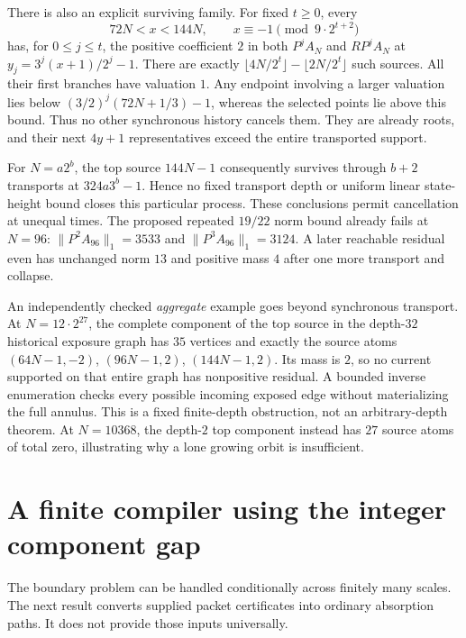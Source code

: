 \documentclass[11pt]{article}
\begin{document}
There is also an explicit surviving family. For fixed $t\ge0$, every
\[
72N<x<144N,\qquad x\equiv-1\pmod{9\cdot2^{t+2}}
\]
has, for $0\le j\le t$, the positive coefficient $2$ in both
$P^jA_N$ and $RP^jA_N$ at $y_j=3^j(x+1)/2^j-1$.
There are exactly
$\lfloor4N/2^t\rfloor-\lfloor2N/2^t\rfloor$ such sources.
All their first branches have valuation $1$. Any endpoint involving a
larger valuation lies below $(3/2)^j(72N+1/3)-1$, whereas the selected
points lie above this bound. Thus no other synchronous history cancels
them. They are already roots, and their next $4y+1$ representatives
exceed the entire transported support.

For $N=a2^b$, the top source $144N-1$ consequently survives through
$b+2$ transports at $324a3^b-1$. Hence no fixed transport depth or
uniform linear state-height bound closes this particular process.
These conclusions permit cancellation at unequal times. The proposed
repeated $19/22$ norm bound already fails at $N=96$:
$\|P^2A_{96}\|_1=3533$ and $\|P^3A_{96}\|_1=3124$.
A later reachable residual even has unchanged norm $13$ and positive
mass $4$ after one more transport and collapse.

An independently checked \emph{aggregate} example goes beyond synchronous
transport. At $N=12\cdot2^{27}$, the complete component of the top source
in the depth-$32$ historical exposure graph has $35$ vertices and exactly
the source atoms $(64N-1,-2)$, $(96N-1,2)$, $(144N-1,2)$.
Its mass is $2$, so no current supported on that entire graph has
nonpositive residual. A bounded inverse enumeration checks every possible
incoming exposed edge without materializing the full annulus.
This is a fixed finite-depth obstruction, not an arbitrary-depth theorem.
At $N=10368$, the depth-$2$ top component instead has $27$ source atoms
of total zero, illustrating why a lone growing orbit is insufficient.

\section{A finite compiler using the integer component gap}
The boundary problem can be handled conditionally across finitely many
scales. The next result converts supplied packet certificates into
ordinary absorption paths. It does not provide those inputs universally.
\end{document}
